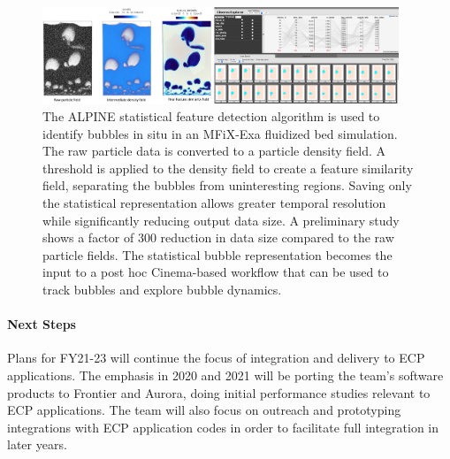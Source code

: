 \begin{figure}[htb]
	\begin{center}
		\includegraphics[width=0.95\textwidth]{projects/2.3.4-DataViz/2.3.4.16-ALPINE-ZFP/alpine-cinema-mfixexa-workflow.png}
		\caption{The ALPINE statistical feature detection algorithm is used to identify bubbles in situ in an MFiX-Exa fluidized bed simulation.  The raw particle data is converted to a particle density field.  A threshold is applied to the density field to create a feature similarity field, separating the bubbles from uninteresting regions.  Saving only the statistical representation allows greater temporal resolution while significantly reducing output data size.  A preliminary study shows a factor of 300 reduction in data size compared to the raw particle fields. The statistical bubble representation becomes the input to a post hoc Cinema-based workflow that can be used to track bubbles and explore bubble dynamics. }
		\label{fig:alpine-statistical-feature}
	\end{center}
\end{figure}

\paragraph{Next Steps}

Plans for FY21-23 will continue the focus of integration and delivery to ECP applications. The emphasis in 2020 and 2021 will be porting the team’s software products to Frontier and Aurora, doing initial performance studies relevant to ECP applications. The team will also focus on outreach and prototyping integrations with ECP application codes in order to facilitate full integration in later years.

